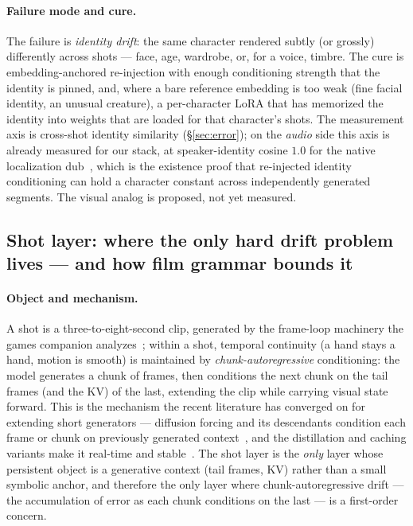 \documentclass[11pt]{article}
\begin{document}
\paragraph{Failure mode and cure.} The failure is \emph{identity drift}: the same character rendered subtly
(or grossly) differently across shots --- face, age, wardrobe, or, for a voice, timbre. The cure is
embedding-anchored re-injection with enough conditioning strength that the identity is pinned, and, where a bare
reference embedding is too weak (fine facial identity, an unusual creature), a per-character LoRA that has
memorized the identity into weights that are loaded for that character's shots. The measurement axis is
cross-shot identity similarity (\S\ref{sec:error}); on the \emph{audio} side this axis is already measured for
our stack, at speaker-identity cosine $1.0$ for the native localization dub~\cite{games}, which is the existence
proof that re-injected identity conditioning can hold a character constant across independently generated
segments. The visual analog is proposed, not yet measured.

\subsection{Shot layer: where the only hard drift problem lives --- and how film grammar bounds it}
\label{sec:shot}

\paragraph{Object and mechanism.} A shot is a three-to-eight-second clip, generated by the frame-loop machinery
the games companion analyzes~\cite{games}; within a shot, temporal continuity (a hand stays a hand, motion is
smooth) is maintained by \emph{chunk-autoregressive} conditioning: the model generates a chunk of frames, then
conditions the next chunk on the tail frames (and the KV) of the last, extending the clip while carrying visual
state forward. This is the mechanism the recent literature has converged on for extending short generators ---
diffusion forcing and its descendants condition each frame or chunk on previously generated
context~\cite{diffusionforcing,selfforcing}, and the distillation and caching variants make it real-time and
stable~\cite{causalforcing,oneforcing,tethercache}. The shot layer is the \emph{only} layer whose persistent
object is a generative context (tail frames, KV) rather than a small symbolic anchor, and therefore the only
layer where chunk-autoregressive drift --- the accumulation of error as each chunk conditions on the last --- is a
first-order concern.
\end{document}
